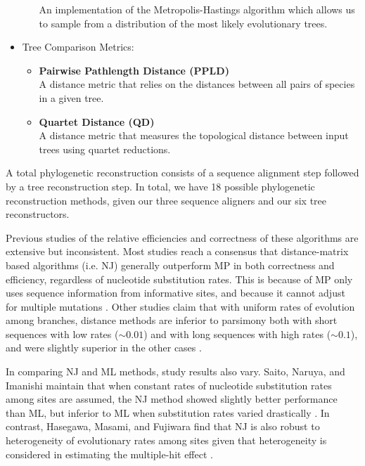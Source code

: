 \documentclass[10pt,twocolumn]{article}
\begin{document}
\begin{itemize}
\begin{itemize}
      An implementation of the Metropolis-Hastings algorithm which allows us to sample
      from a distribution of the most likely evolutionary trees.
  \end{itemize}
\item Tree Comparison Metrics:
  \begin{itemize}
    \item \textbf{Pairwise Pathlength Distance (PPLD)}\\
      A distance metric that relies on the distances between
      all pairs of species in a given tree. 
    \item \textbf{Quartet Distance (QD)}\\
      A distance metric that measures the topological distance between
      input trees using quartet reductions.
  \end{itemize}
\end{itemize}

A total phylogenetic reconstruction consists of a sequence alignment step
followed by a tree reconstruction step. In total, we have 18 possible
phylogenetic reconstruction methods, given our three sequence aligners and our six tree reconstructors.

Previous studies of the relative efficiencies and correctness of these
algorithms are extensive but inconsistent. Most studies reach a consensus
that distance-matrix based algorithms (i.e. NJ) generally outperform
MP in both correctness and efficiency, regardless of nucleotide substitution
rates. This is because of MP only uses sequence information from
informative sites, and because it cannot adjust for multiple mutations \cite{sourdis1988relative}. Other studies claim that with uniform rates of evolution among branches, distance methods are inferior to parsimony both with short sequences with low rates ($\sim 0.01$) and with long sequences with high rates ($\sim 0.1$), and were slightly superior in the other cases \cite{kuhner1994simulation}.

In comparing NJ and ML methods, study results also vary. Saito, Naruya, and 
Imanishi maintain that when constant rates of nucleotide substitution 
rates among sites are assumed, the NJ method showed slightly better
performance than ML, but inferior to ML when substitution rates varied
drastically \cite{saitou1989relative}. In contrast, Hasegawa, Masami, and
Fujiwara find that NJ is also robust to heterogeneity of evolutionary rates
among sites given that heterogeneity is considered in estimating the
multiple-hit effect \cite{hasegawa1993relative}. 
\end{document}
